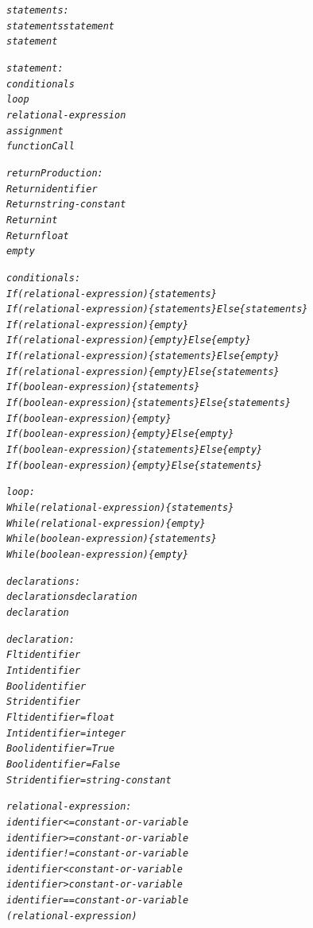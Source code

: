\documentclass[12pt]{report}
\begin{document}
\begin{alltt}
     \textit{statements:}
          \textit{statements statement}
          \textit{statement}

     \textit{statement:}
          \textit{conditionals}
          \textit{loop}
          \textit{relational-expression}
          \textit{assignment}
          \textit{functionCall}

     \textit{returnProduction:}
          \textit{Return identifier}
          \textit{Return string-constant}
          \textit{Return int}
          \textit{Return float}
          \textit{empty}

     \textit{conditionals:}
          \textit{If ( relational-expression ) \{ statements \}}
          \textit{If ( relational-expression ) \{ statements \} Else \{ statements \}}
          \textit{If ( relational-expression ) \{ empty \}}
          \textit{If ( relational-expression ) \{ empty \} Else \{ empty \}}
          \textit{If ( relational-expression ) \{ statements \} Else \{ empty \}}
          \textit{If ( relational-expression ) \{ empty \} Else \{ statements \}}
          \textit{If ( boolean-expression ) \{ statements \}}
          \textit{If ( boolean-expression ) \{ statements \} Else \{ statements \}}
          \textit{If ( boolean-expression ) \{ empty \}}
          \textit{If ( boolean-expression ) \{ empty \} Else \{ empty \}}
          \textit{If ( boolean-expression ) \{ statements \} Else \{ empty \}}
          \textit{If ( boolean-expression ) \{ empty \} Else \{ statements \}}

     \textit{loop:}
          \textit{While ( relational-expression ) \{ statements \}}
          \textit{While ( relational-expression ) \{ empty \}}
          \textit{While ( boolean-expression ) \{ statements \}}
          \textit{While ( boolean-expression ) \{ empty \}}

     \textit{declarations:}
          \textit{declarations declaration}
          \textit{declaration}

     \textit{declaration:}
          \textit{Flt identifier}
          \textit{Int identifier}
          \textit{Bool identifier}
          \textit{Str identifier}
          \textit{Flt identifier = float}
          \textit{Int identifier = integer}
          \textit{Bool identifier = True}
          \textit{Bool identifier = False}
          \textit{Str identifier = string-constant}

     \textit{relational-expression:}
          \textit{identifier <= constant-or-variable}
          \textit{identifier >= constant-or-variable}
          \textit{identifier != constant-or-variable}
          \textit{identifier < constant-or-variable}
          \textit{identifier > constant-or-variable}
          \textit{identifier == constant-or-variable}
          \textit{( relational-expression )}


\end{alltt}
\end{document}
